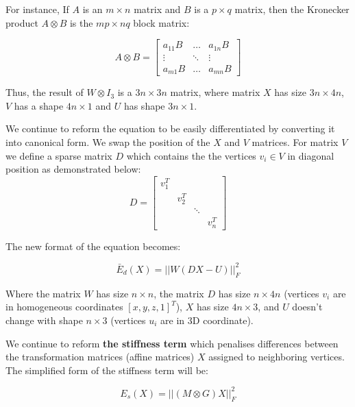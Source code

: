 \documentclass[../structure.tex]{subfiles}
\begin{document}
For instance, If $A$ is an $m \times n$ matrix and $B$ is a $p \times q$ matrix, then the Kronecker product $A \otimes B$ is the $mp \times nq$ block matrix:

\begin{equation*}
A \otimes B =
\begin{bmatrix}
a_{11}B & \dots  & a_{1n}B \\
\vdots  & \ddots & \vdots  \\
a_{m1}B & \dots  & a_{mn}B
\end{bmatrix}
\end{equation*}

Thus, the result of $W \otimes I_{3}$ is a $3n\times 3n$ matrix, where matrix $X$ has size $3n\times4n$, $V$ has a shape $4n\times1$ and $U$ has shape $3n\times1$.

We continue to reform the equation to be easily differentiated by converting it into canonical form. We swap the position of the $X$ and $V$ matrices. For matrix $V$ we define a sparse matrix $D$ which contains the the vertices $v_{i} \in V$ in diagonal position as demonstrated below:
\begin{equation}
D =
\begin{bmatrix}
v_{1}^T & & & \\
& v_{2}^T & & \\
& & \ddots & \\
& & & v_{n}^T
\end{bmatrix}
\end{equation}

The new format of the equation becomes:

\begin{equation}
\bar{E}_{d}(X) = ||W(DX-U)||_{F}^2
\end{equation}

Where the matrix $W$ has size $n\times n$, the matrix $D$ has size $n\times 4n$ (vertices $v_{i}$ are in homogeneous coordinates $[x,y,z,1]^T$), $X$ has size $4n\times 3$, and $U$ doesn't change with shape $n\times 3$ (vertices $u_{i}$ are in 3D coordinate).

We continue to reform \textbf{the stiffness term} which penalises differences between the transformation matrices (affine matrices) $X$ assigned to neighboring vertices. The simplified form of the stiffness term will be:

\begin{equation}
E_{s}(X) = ||(M\otimes G)X||_{F}^2
\end{equation}
\end{document}
